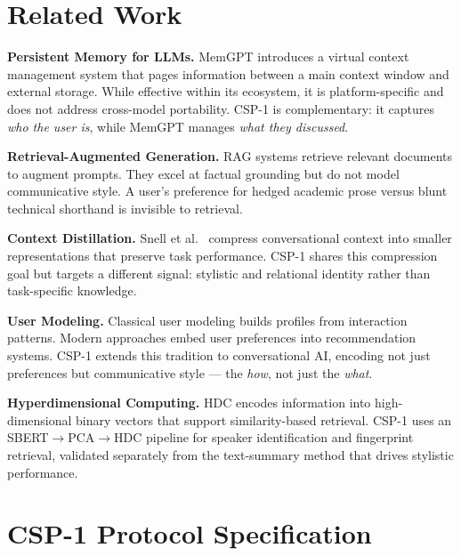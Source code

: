 \documentclass[11pt,a4paper]{article}
\begin{document}
\section{Related Work}

\textbf{Persistent Memory for LLMs.} MemGPT \cite{packer2023memgpt} introduces a virtual context management system that pages information between a main context window and external storage. While effective within its ecosystem, it is platform-specific and does not address cross-model portability. CSP-1 is complementary: it captures \textit{who the user is}, while MemGPT manages \textit{what they discussed}.

\textbf{Retrieval-Augmented Generation.} RAG systems \cite{lewis2020rag} retrieve relevant documents to augment prompts. They excel at factual grounding but do not model communicative style. A user's preference for hedged academic prose versus blunt technical shorthand is invisible to retrieval.

\textbf{Context Distillation.} Snell et al.\ \cite{snell2022context} compress conversational context into smaller representations that preserve task performance. CSP-1 shares this compression goal but targets a different signal: stylistic and relational identity rather than task-specific knowledge.

\textbf{User Modeling.} Classical user modeling \cite{rich1979stereotypes} builds profiles from interaction patterns. Modern approaches embed user preferences into recommendation systems. CSP-1 extends this tradition to conversational AI, encoding not just preferences but communicative style --- the \textit{how}, not just the \textit{what}.

\textbf{Hyperdimensional Computing.} HDC \cite{kanerva2009hyperdimensional} encodes information into high-dimensional binary vectors that support similarity-based retrieval. CSP-1 uses an SBERT$\to$PCA$\to$HDC pipeline for speaker identification and fingerprint retrieval, validated separately from the text-summary method that drives stylistic performance.

\section{CSP-1 Protocol Specification}
\end{document}
